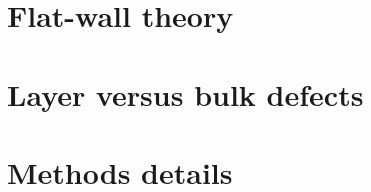 \documentclass[aps,pre,twocolumn,superscriptaddress,amsmath,amssymb,reprint]{revtex4-2}
\begin{document}
\appendix
\section{Flat-wall theory}\label{app:flatwall}
\section{Layer versus bulk defects}\label{app:layer}
\section{Methods details}\label{app:methods}


\end{document}
